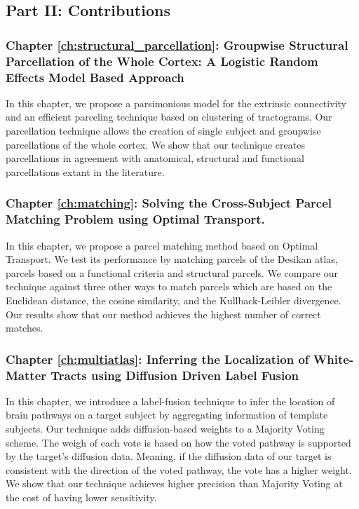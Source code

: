 \subsection{Part II: Contributions}

\subsubsection{Chapter \ref{ch:structural_parcellation}: Groupwise Structural Parcellation of the Whole Cortex: A Logistic Random Effects Model Based Approach}
In this chapter, we propose a parsimonious model for the extrinsic connectivity
and an efficient parceling technique based on clustering of tractograms. 
Our parcellation technique allows the creation of single subject and groupwise parcellations
of the whole cortex. We show that our technique creates parcellations in
agreement with anatomical, structural and functional parcellations extant in 
the literature.

\subsubsection{Chapter \ref{ch:matching}: Solving the Cross-Subject Parcel Matching Problem using Optimal Transport.}
In this chapter, we propose a parcel matching method based on Optimal Transport.
We test its performance by matching parcels of the Desikan atlas, parcels based
on a functional criteria and structural parcels. We compare our technique against
three other ways to match parcels which are based on the Euclidean distance, the
cosine similarity, and the Kullback-Leibler divergence. Our results show that
our method achieves the highest number of correct matches.

\subsubsection{Chapter \ref{ch:multiatlas}: Inferring the Localization of White-Matter Tracts using Diffusion Driven Label Fusion}
In this chapter, we introduce a label-fusion technique to infer the location of
brain pathways on a target subject by aggregating information of template subjects.
Our technique adds diffusion-based weights to a Majority Voting scheme. The weigh
of each vote is based on how the voted pathway is supported by the target's diffusion data.
Meaning, if the 
diffusion data of our target is consistent with the direction of the voted pathway,
the vote has a higher weight. We show that
our technique achieves higher precision than Majority Voting at the cost of
having lower sensitivity.


